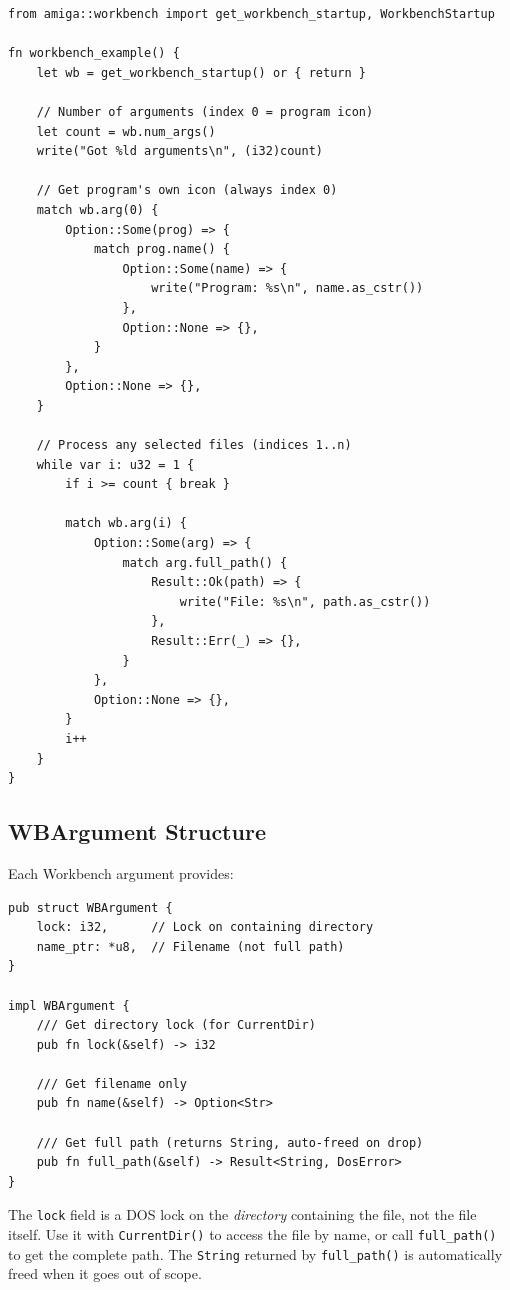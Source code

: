 \begin{lstlisting}
from amiga::workbench import get_workbench_startup, WorkbenchStartup

fn workbench_example() {
    let wb = get_workbench_startup() or { return }

    // Number of arguments (index 0 = program icon)
    let count = wb.num_args()
    write("Got %ld arguments\n", (i32)count)

    // Get program's own icon (always index 0)
    match wb.arg(0) {
        Option::Some(prog) => {
            match prog.name() {
                Option::Some(name) => {
                    write("Program: %s\n", name.as_cstr())
                },
                Option::None => {},
            }
        },
        Option::None => {},
    }

    // Process any selected files (indices 1..n)
    while var i: u32 = 1 {
        if i >= count { break }

        match wb.arg(i) {
            Option::Some(arg) => {
                match arg.full_path() {
                    Result::Ok(path) => {
                        write("File: %s\n", path.as_cstr())
                    },
                    Result::Err(_) => {},
                }
            },
            Option::None => {},
        }
        i++
    }
}
\end{lstlisting}

\subsection{WBArgument Structure}

Each Workbench argument provides:

\begin{lstlisting}
pub struct WBArgument {
    lock: i32,      // Lock on containing directory
    name_ptr: *u8,  // Filename (not full path)
}

impl WBArgument {
    /// Get directory lock (for CurrentDir)
    pub fn lock(&self) -> i32

    /// Get filename only
    pub fn name(&self) -> Option<Str>

    /// Get full path (returns String, auto-freed on drop)
    pub fn full_path(&self) -> Result<String, DosError>
}
\end{lstlisting}

\begin{tipbox}
The \texttt{lock} field is a DOS lock on the \emph{directory} containing the file, not the file itself. Use it with \texttt{CurrentDir()} to access the file by name, or call \texttt{full\_path()} to get the complete path. The \texttt{String} returned by \texttt{full\_path()} is automatically freed when it goes out of scope.
\end{tipbox}

